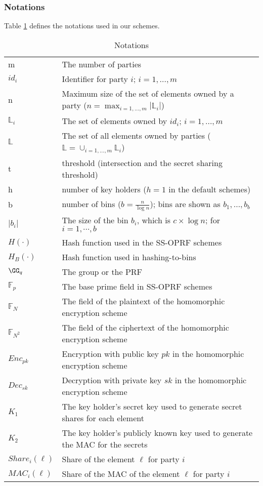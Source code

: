 \subsubsection{Notations} 
Table \ref{tab:Notations} defines the notations used in our schemes. 
\begin{table}[h!]
  \centering
  \caption{Notations}
  \label{tab:Notations}
  \begin{tabular}{ll}
    \toprule
     &  \\
    \midrule
    m & The number of parties \\
    $id_i$ &  Identifier for party $i$; $i = 1, \dots, m$\\
    n &  Maximum size of the set of elements owned by a party ($n = \max_{i = 1, \dots, m}{|\mathbb{L}_i|}$)\\
    $\mathbb{L}_i$ & The set of elements owned by $id_i$; $i = 1, \dots, m$\\
    $\mathbb{L}$ & The set of all elements owned by parties ($\mathbb{L} = \cup_{i = 1, \dots, m}{\mathbb{L}_i}$)\\
    t &  threshold (intersection and the secret sharing threshold)\\
    h & number of key holders ($h=1$ in the default schemes)\\
    b &  number of bins ($b = \frac{n}{\log{n}}$); bins are shown as $b_1, \dots, b_b$\\
    $|b_i|$ & The size of the bin $b_i$, which is $c \times \log{n}$; for $i=1, \cdots, b$\\
    $H(\cdot)$ & Hash function used in the SS-OPRF schemes\\
    $H_B(\cdot)$ & Hash function used in hashing-to-bins\\
    $\GG_q$ & The group or the PRF\\
    $\mathbb{F}_p$ & The base prime field in SS-OPRF schemes\\
    $\mathbb{F}_N$ & The field of the plaintext of the homomorphic encryption scheme\\
    $\mathbb{F}_{N^2}$ & The field of the ciphertext of the homomorphic encryption scheme\\
    $Enc_{pk}$ &  Encryption with public key $pk$ in the homomorphic encryption scheme\\
    $Dec_{sk}$ &  Decryption with private key $sk$ in the homomorphic encryption scheme\\   
    $K_1$ & The key holder's secret key used to generate secret shares for each element\\
    $K_2$ & The key holder's publicly known key used to generate the MAC for the secrets \\
    $Share_i(\ell)$ & Share of the element $\ell$ for party $i$\\
    $MAC_i(\ell)$ & Share of the MAC of the element $\ell$ for party $i$\\
    \bottomrule
  \end{tabular}
\end{table}

